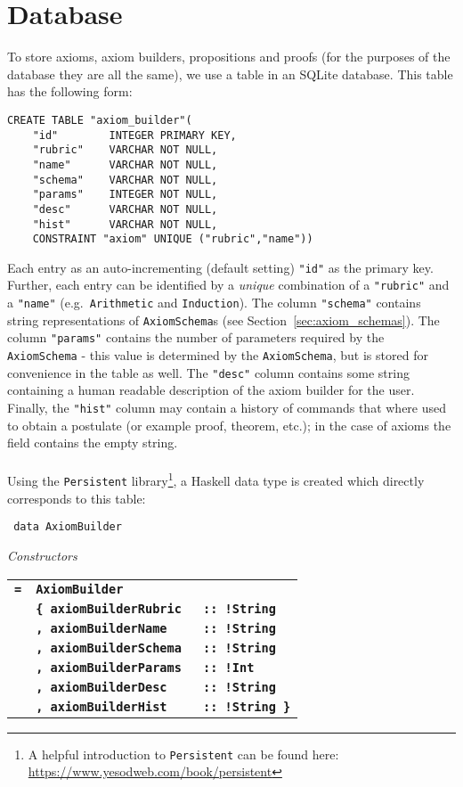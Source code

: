 \documentclass[notitlepage]{report}
\newcommand\m[1]{\texttt{#1}}
\newcommand\ms[1]{\texttt{#1}}
\begin{document}
\section{Database}
To store axioms, axiom builders, propositions and proofs (for the purposes of
the database they are all the same), we use a table in an SQLite database. This
table has the following form:

\begin{verbatim}
CREATE TABLE "axiom_builder"(
    "id"        INTEGER PRIMARY KEY,
    "rubric"    VARCHAR NOT NULL,
    "name"      VARCHAR NOT NULL,
    "schema"    VARCHAR NOT NULL,
    "params"    INTEGER NOT NULL,
    "desc"      VARCHAR NOT NULL,
    "hist"      VARCHAR NOT NULL,
    CONSTRAINT "axiom" UNIQUE ("rubric","name"))
\end{verbatim}

Each entry as an auto-incrementing (default setting) \ms{"id"} as the primary
key. Further, each entry can be identified by a \emph{unique} combination of a
\ms{"rubric"} and a \ms{"name"} (e.g.\ \texttt{Arithmetic} and
\texttt{Induction}). The column \ms{"schema"} contains string representations of
\m{AxiomSchema}s (see Section~\ref{sec:axiom_schemas}). The column \ms{"params"}
contains the number of parameters required by the \m{AxiomSchema} - this value
is determined by the \m{AxiomSchema}, but is stored for convenience in the table
as well. The \ms{"desc"} column contains some string containing a human readable
description of the axiom builder for the user. Finally, the \ms{"hist"} column
may contain a history of commands that where used to obtain a postulate (or
example proof, theorem, etc.); in the case of axioms the field contains the
empty string.\\\\
Using the \texttt{Persistent} library\footnote{A helpful introduction to
\texttt{Persistent} can be found here:
\url{https://www.yesodweb.com/book/persistent}}, a Haskell data type is created
which directly corresponds to this table:

\newcommand{\htt}[1]{{\small\bfseries\texttt{#1}}}

\begin{haddockdesc}
\item[\texttt{
data AxiomBuilder
}]
{\haddockbegindoc
\enspace \emph{Constructors}\par
\begin{tabulary}{\linewidth}{@{}llJ@{}}
    \htt{=}  &   \htt{AxiomBuilder}         &                 \\
             &   \htt{\{  axiomBuilderRubric } &\htt{:: !String} \\
             &   \htt{,   axiomBuilderName   } &\htt{:: !String} \\
             &   \htt{,   axiomBuilderSchema } &\htt{:: !String} \\
             &   \htt{,   axiomBuilderParams } &\htt{:: !Int   } \\
             &   \htt{,   axiomBuilderDesc   } &\htt{:: !String} \\
             &   \htt{,   axiomBuilderHist   } &\htt{:: !String \}}
 \end{tabulary}}
\end{haddockdesc}
\end{document}
